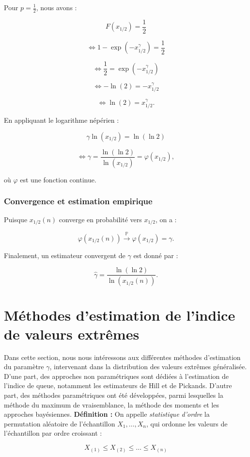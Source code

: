 \documentclass{article}
\begin{document}
Pour \(p = \frac{1}{2}\), nous avons :

\[
F(x_{1/2}) = \frac{1}{2}
\]

\[
\iff 1 - \exp(-x_{1/2}^{\gamma}) = \frac{1}{2}
\]

\[
\iff \frac{1}{2} = \exp(-x_{1/2}^{\gamma})
\]

\[
\iff -\ln(2) = -x_{1/2}^{\gamma}
\]

\[
\iff \ln(2) = x_{1/2}^{\gamma}.
\]

En appliquant le logarithme népérien :

\[
\gamma \ln(x_{1/2}) = \ln(\ln 2)
\]

\[
\iff \gamma = \frac{\ln(\ln 2)}{\ln(x_{1/2})} = \varphi(x_{1/2}),
\]

où \(\varphi\) est une fonction continue.

\subsubsection{Convergence et estimation empirique}

Puisque \(x_{1/2}(n)\) converge en probabilité vers \(x_{1/2}\), on a :

\[
\varphi(x_{1/2}(n)) \xrightarrow{\mathbb{P}} \varphi(x_{1/2}) = \gamma.
\]

Finalement, un estimateur convergent de \(\gamma\) est donné par :

\[
\hat{\gamma} = \frac{\ln(\ln 2)}{\ln(x_{1/2}(n))}.
\]

\section{Méthodes d'estimation de l'indice de valeurs extrêmes}
Dans cette section, nous nous intéressons aux différentes méthodes d'estimation du paramètre \(\gamma\), intervenant dans la distribution des valeurs extrêmes généralisée. D'une part, des approches non paramétriques sont dédiées à l'estimation de l'indice de queue, notamment les estimateurs de Hill et de Pickands. D'autre part, des méthodes paramétriques ont été développées, parmi lesquelles la méthode du maximum de vraisemblance, la méthode des moments et les approches bayésiennes.
\newline
\textbf{Définition :} On appelle \textit{statistique d'ordre} la permutation aléatoire de l'échantillon \(X_1, \dots, X_n\), qui ordonne les valeurs de l’échantillon par ordre croissant :

\[
X_{(1)} \leq X_{(2)} \leq \dots \leq X_{(n)}
\]
\end{document}
